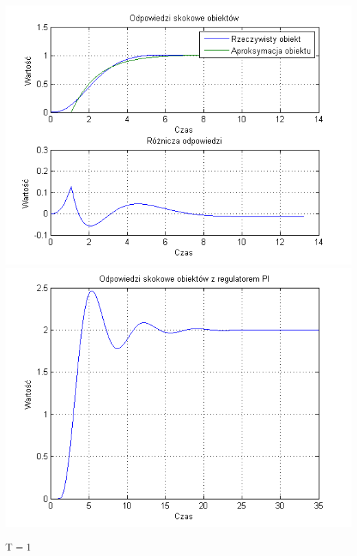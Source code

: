 \documentclass[10pt,a4paper]{article}
\begin{document}
\begin{center}
\includegraphics[scale=1]{images/jeden/skrypt_263.png}\\
\includegraphics[scale=1]{images/jeden/skrypt_264.png}\\
\end{center}
\newpage
T = 1
\end{document}
